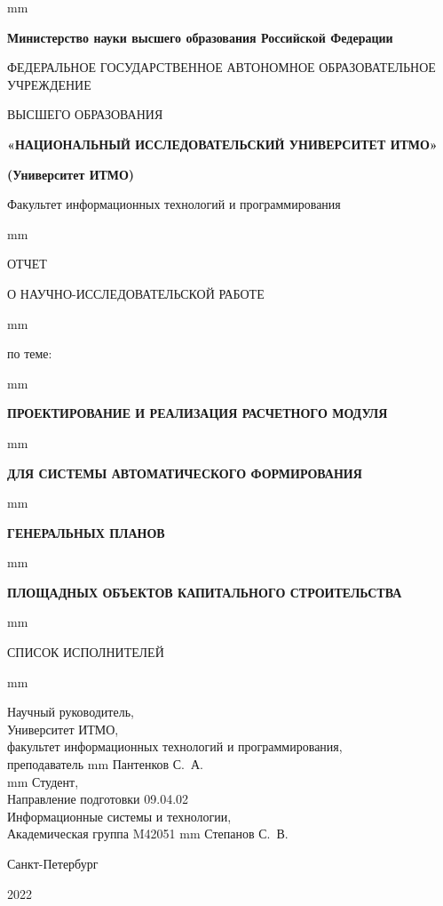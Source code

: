 \thispagestyle{empty}
 mm
\centerline{\footnotesize{\bf{Министерство науки высшего образования Российской Федерации}}}
\centerline{\footnotesize{{ФЕДЕРАЛЬНОЕ ГОСУДАРСТВЕННОЕ АВТОНОМНОЕ ОБРАЗОВАТЕЛЬНОЕ УЧРЕЖДЕНИЕ}}}
\centerline{\small{{ВЫСШЕГО ОБРАЗОВАНИЯ}}}
\centerline{{\bf{«НАЦИОНАЛЬНЫЙ ИССЛЕДОВАТЕЛЬСКИЙ УНИВЕРСИТЕТ ИТМО»}}}
\centerline{{\bf{(Университет ИТМО)}}}
\centerline{Факультет информационных технологий и программирования}

 mm
\centerline{\LARGE{ОТЧЕТ}}
\centerline{\LARGE{О НАУЧНО-ИССЛЕДОВАТЕЛЬСКОЙ РАБОТЕ}}
 mm
\centerline{\large{по теме:}}
 mm
\centerline{\large\bf{ПРОЕКТИРОВАНИЕ И РЕАЛИЗАЦИЯ РАСЧЕТНОГО МОДУЛЯ}}
 mm
\centerline{\large\bf{ДЛЯ СИСТЕМЫ АВТОМАТИЧЕСКОГО ФОРМИРОВАНИЯ}}
 mm
\centerline{\large\bf{ГЕНЕРАЛЬНЫХ ПЛАНОВ}}
 mm
\centerline{\large\bf{ПЛОЩАДНЫХ ОБЪЕКТОВ КАПИТАЛЬНОГО СТРОИТЕЛЬСТВА}}
 mm
\centerline{\large{СПИСОК ИСПОЛНИТЕЛЕЙ}}
 mm
\large{
\noindent
Научный руководитель, \\
Университет ИТМО, \\
факультет информационных технологий и программирования, \\
преподаватель  mm Пантенков С.~А.\\
 mm \noindent
Студент, \\
Направление подготовки 09.04.02 \\
Информационные системы и технологии, \\
Академическая группа M42051  mm Степанов С.~В.\\
\vfill \hfil \break
\centerline{\large Санкт-Петербург } \centerline{ 2022 }}
\newpage

